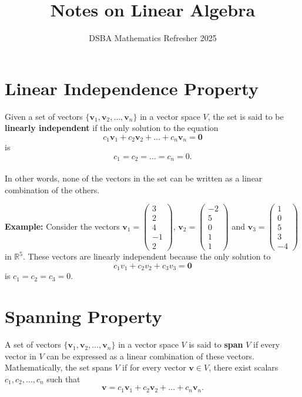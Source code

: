 \documentclass[]{article}
\title{Notes on Linear Algebra}
\author{DSBA Mathematics Refresher 2025}
\date{}
\begin{document}
	
	\maketitle
	
	\begin{abstract}
		
	\end{abstract}
	
	
	\section{Linear Independence Property}
	
	Given a set of vectors $\{\mathbf{v}_1, \mathbf{v}_2, \dots, \mathbf{v}_n\}$ in a vector space $V$, the set is said to be \textbf{linearly independent} if the only solution to the equation
	$$
	c_1\mathbf{v}_1 + c_2\mathbf{v}_2 + \dots + c_n\mathbf{v}_n = \mathbf{0}
	$$
	is 
	$$
	c_1 = c_2 = \dots = c_n = 0.
	$$\\
	In other words, none of the vectors in the set can be written as a linear combination of the others.
	
	\noindent \textbf{Example:}
	Consider the vectors
	$\mathbf{v}_1 = \begin{pmatrix} 3 \\ 2 \\ 4 \\ -1 \\ 2 \end{pmatrix}$,
	$\mathbf{v}_2 = \begin{pmatrix} -2 \\ 5 \\ 0 \\ 1 \\ 1 \end{pmatrix}$
	and
	$\mathbf{v}_3 = \begin{pmatrix} 1 \\ 0 \\ 5 \\ 3 \\ -4 \end{pmatrix}$
	in $\mathbb{R}^5$.
	These vectors are linearly independent because the only solution to
	$$
	c_1v_1 + c_2v_2 + c_3v_3 = \mathbf{0}
	$$
	is $c_1 = c_2 = c_3 = 0$.
	
	\section{Spanning Property}
	
	A set of vectors $\{\mathbf{v}_1, \mathbf{v}_2, \dots, \mathbf{v}_n\}$ in a vector space $V$ is said to \textbf{span} $V$ if every vector in $V$ can be expressed as a linear combination of these vectors.
	Mathematically, the set spans $V$ if for every vector $\mathbf{v} \in V$, there exist scalars $c_1, c_2, \dots, c_n$ such that
	$$
	\mathbf{v} = c_1\mathbf{v}_1 + c_2\mathbf{v}_2 + \dots + c_n\mathbf{v}_n.
	$$
	
\end{document}
